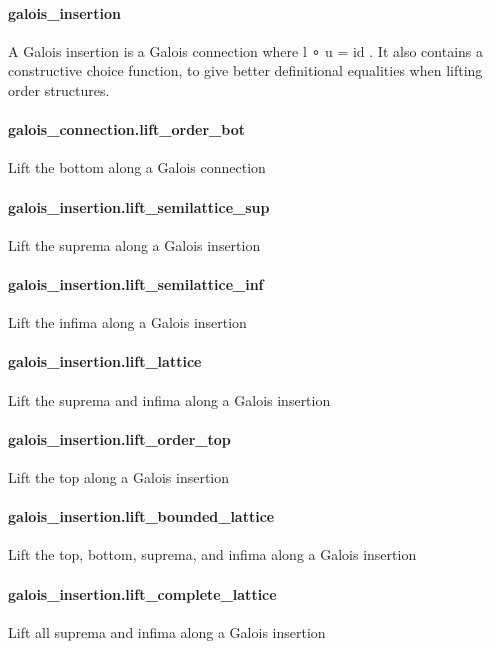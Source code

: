 \documentclass{article}
\begin{document}
\paragraph{galois\_insertion}
\par
A Galois insertion is a Galois connection where 
\colorbox[RGB]{253,246,227}{{{{\color[RGB]{101, 123, 131} l ∘ u  }}}{{{\color[RGB]{181, 137, 0} = }}}{{{\color[RGB]{101, 123, 131}  id }}}}. It also contains a constructive
choice function, to give better definitional equalities when lifting order structures.
\paragraph{galois\_connection.lift\_order\_bot}
\par
Lift the bottom along a Galois connection
\paragraph{galois\_insertion.lift\_semilattice\_sup}
\par
Lift the suprema along a Galois insertion
\paragraph{galois\_insertion.lift\_semilattice\_inf}
\par
Lift the infima along a Galois insertion
\paragraph{galois\_insertion.lift\_lattice}
\par
Lift the suprema and infima along a Galois insertion
\paragraph{galois\_insertion.lift\_order\_top}
\par
Lift the top along a Galois insertion
\paragraph{galois\_insertion.lift\_bounded\_lattice}
\par
Lift the top, bottom, suprema, and infima along a Galois insertion
\paragraph{galois\_insertion.lift\_complete\_lattice}
\par
Lift all suprema and infima along a Galois insertion
\end{document}
